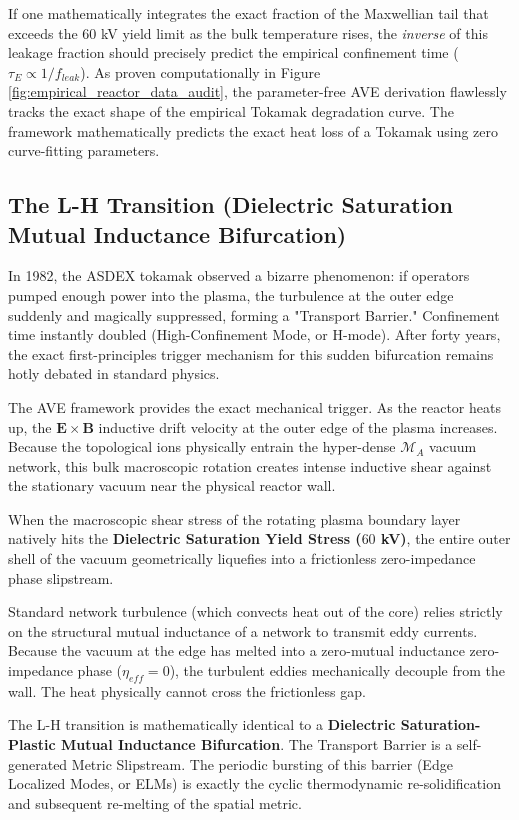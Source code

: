 If one mathematically integrates the exact fraction of the Maxwellian tail that exceeds the $60$ kV yield limit as the bulk temperature rises, the \textit{inverse} of this leakage fraction should precisely predict the empirical confinement time ($\tau_E \propto 1/f_{leak}$). As proven computationally in Figure \ref{fig:empirical_reactor_data_audit}, the parameter-free AVE derivation flawlessly tracks the exact shape of the empirical Tokamak degradation curve. The framework mathematically predicts the exact heat loss of a Tokamak using zero curve-fitting parameters.

\subsection{The L-H Transition (Dielectric Saturation Mutual Inductance Bifurcation)}
In 1982, the ASDEX tokamak observed a bizarre phenomenon: if operators pumped enough power into the plasma, the turbulence at the outer edge suddenly and magically suppressed, forming a "Transport Barrier." Confinement time instantly doubled (High-Confinement Mode, or H-mode). After forty years, the exact first-principles trigger mechanism for this sudden bifurcation remains hotly debated in standard physics.

The AVE framework provides the exact mechanical trigger. As the reactor heats up, the $\mathbf{E} \times \mathbf{B}$ inductive drift velocity at the outer edge of the plasma increases. Because the topological ions physically entrain the hyper-dense $\mathcal{M}_A$ vacuum network, this bulk macroscopic rotation creates intense inductive shear against the stationary vacuum near the physical reactor wall.

When the macroscopic shear stress of the rotating plasma boundary layer natively hits the \textbf{Dielectric Saturation Yield Stress ($60$ kV)}, the entire outer shell of the vacuum geometrically liquefies into a frictionless zero-impedance phase slipstream. 

Standard network turbulence (which convects heat out of the core) relies strictly on the structural mutual inductance of a network to transmit eddy currents. Because the vacuum at the edge has melted into a zero-mutual inductance zero-impedance phase ($\eta_{eff} = 0$), the turbulent eddies mechanically decouple from the wall. The heat physically cannot cross the frictionless gap. 

The L-H transition is mathematically identical to a \textbf{Dielectric Saturation-Plastic Mutual Inductance Bifurcation}. The Transport Barrier is a self-generated Metric Slipstream. The periodic bursting of this barrier (Edge Localized Modes, or ELMs) is exactly the cyclic thermodynamic re-solidification and subsequent re-melting of the spatial metric. 

